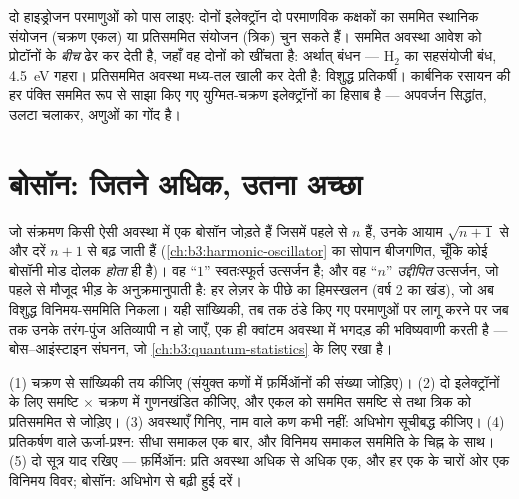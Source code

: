 \begin{example}[सहसंयोजी बंध]\label{ex:b3:identical-particles:bond}
दो हाइड्रोजन परमाणुओं को पास लाइए: दोनों इलेक्ट्रॉन दो परमाणविक कक्षकों
का सममित स्थानिक संयोजन (चक्रण एकल) या प्रतिसममित संयोजन (त्रिक) चुन
सकते हैं। सममित अवस्था आवेश को प्रोटॉनों के \emph{बीच} ढेर कर देती है,
जहाँ वह दोनों को खींचता है: अर्थात् बंधन --- H$_2$ का सहसंयोजी बंध,
\qty{4.5}{eV} गहरा। प्रतिसममित अवस्था मध्य-तल खाली कर देती है: विशुद्ध
प्रतिकर्षी। कार्बनिक रसायन की हर पंक्ति सममित रूप से साझा किए गए
युग्मित-चक्रण इलेक्ट्रॉनों का हिसाब है --- अपवर्जन सिद्धांत, उलटा
चलाकर, अणुओं का गोंद है।
\end{example}

\section{बोसॉन: जितने अधिक, उतना अच्छा}

\begin{proposition}[बोसॉनी संवर्धन]\label{prop:b3:identical-particles:enhancement}
जो संक्रमण किसी ऐसी अवस्था में एक बोसॉन जोड़ते हैं जिसमें पहले से $n$
हैं, उनके आयाम $\sqrt{n + 1}$ से और दरें $n + 1$ से बढ़ जाती हैं
(\cref{ch:b3:harmonic-oscillator} का सोपान बीजगणित, चूँकि कोई बोसॉनी
मोड दोलक \emph{होता} ही है)। वह ``$1$'' स्वतःस्फूर्त उत्सर्जन है; और
वह ``$n$'' \emph{उद्दीपित} उत्सर्जन, जो पहले से मौजूद भीड़ के
अनुक्रमानुपाती है: हर लेज़र के पीछे का हिमस्खलन (वर्ष 2 का खंड), जो अब
विशुद्ध विनिमय-सममिति निकला। यही सांख्यिकी, तब तक ठंडे किए गए परमाणुओं
पर लागू करने पर जब तक उनके तरंग-पुंज अतिव्यापी न हो जाएँ, एक ही
क्वांटम अवस्था में भगदड़ की भविष्यवाणी करती है --- बोस--आइंस्टाइन
संघनन, जो \cref{ch:b3:quantum-statistics} के लिए रखा है।
\end{proposition}
\admitted

\begin{method}\label{met:b3:identical-particles:method}
(1) चक्रण से सांख्यिकी तय कीजिए (संयुक्त कणों में फ़र्मिऑनों की संख्या
जोड़िए)। (2) दो इलेक्ट्रॉनों के लिए समष्टि $\times$ चक्रण में
गुणनखंडित कीजिए, और एकल को सममित समष्टि से तथा त्रिक को प्रतिसममित से
जोड़िए। (3) अवस्थाएँ गिनिए, नाम वाले कण कभी नहीं: अधिभोग सूचीबद्ध
कीजिए। (4) प्रतिकर्षण वाले ऊर्जा-प्रश्न: सीधा समाकल एक बार, और विनिमय
समाकल सममिति के चिह्न के साथ। (5) दो सूत्र याद रखिए --- फ़र्मिऑन: प्रति
अवस्था अधिक से अधिक एक, और हर एक के चारों ओर एक विनिमय विवर; बोसॉन:
अधिभोग से बढ़ी हुई दरें।
\end{method}

